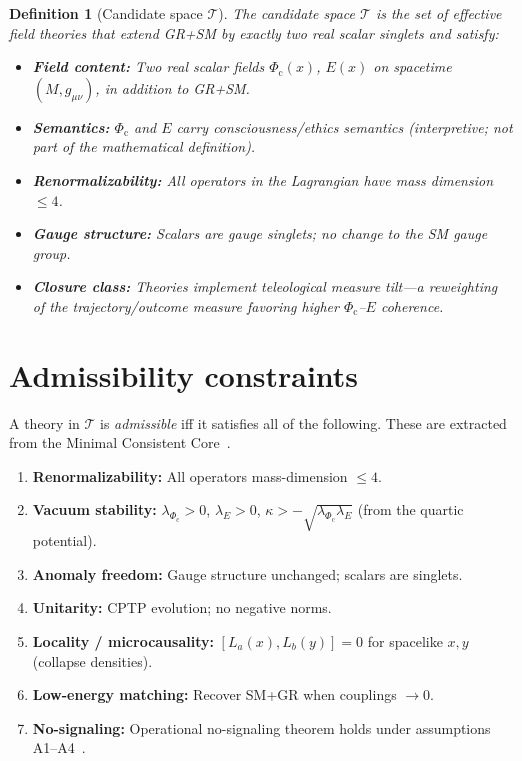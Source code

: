\documentclass[11pt]{article}
\newtheorem{definition}{Definition}
\theoremstyle{remark}
\newcommand{\Phic}{\Phi_{\mathrm{c}}}
\newcommand{\Eth}{E}
\newcommand{\cT}{\mathcal{T}}
\begin{document}
\begin{definition}[Candidate space $\cT$]
\label{def:T}
The candidate space $\cT$ is the set of effective field theories that extend GR+SM by exactly two real scalar singlets and satisfy:
\begin{itemize}[leftmargin=*]
\item \textbf{Field content:} Two real scalar fields $\Phic(x)$, $\Eth(x)$ on spacetime $(M,g_{\mu\nu})$, in addition to GR+SM.
\item \textbf{Semantics:} $\Phic$ and $\Eth$ carry consciousness/ethics semantics (interpretive; not part of the mathematical definition).
\item \textbf{Renormalizability:} All operators in the Lagrangian have mass dimension $\le 4$.
\item \textbf{Gauge structure:} Scalars are gauge singlets; no change to the SM gauge group.
\item \textbf{Closure class:} Theories implement teleological measure tilt---a reweighting of the trajectory/outcome measure favoring higher $\Phic$--$\Eth$ coherence.
\end{itemize}
\end{definition}

\section{Admissibility constraints}

A theory in $\cT$ is \emph{admissible} iff it satisfies all of the following. These are extracted from the Minimal Consistent Core~\cite{Baird2026core}.

\begin{enumerate}[label=(\arabic*),leftmargin=*]
\item \textbf{Renormalizability:} All operators mass-dimension $\le 4$.
\item \textbf{Vacuum stability:} $\lambda_{\Phic} > 0$, $\lambda_{\Eth} > 0$, $\kappa > -\sqrt{\lambda_{\Phic}\lambda_{\Eth}}$ (from the quartic potential).
\item \textbf{Anomaly freedom:} Gauge structure unchanged; scalars are singlets.
\item \textbf{Unitarity:} CPTP evolution; no negative norms.
\item \textbf{Locality / microcausality:} $[L_a(x), L_b(y)] = 0$ for spacelike $x,y$ (collapse densities).
\item \textbf{Low-energy matching:} Recover SM+GR when couplings $\to 0$.
\item \textbf{No-signaling:} Operational no-signaling theorem holds under assumptions A1--A4~\cite{Baird2026core}.
\end{enumerate}
\end{document}
